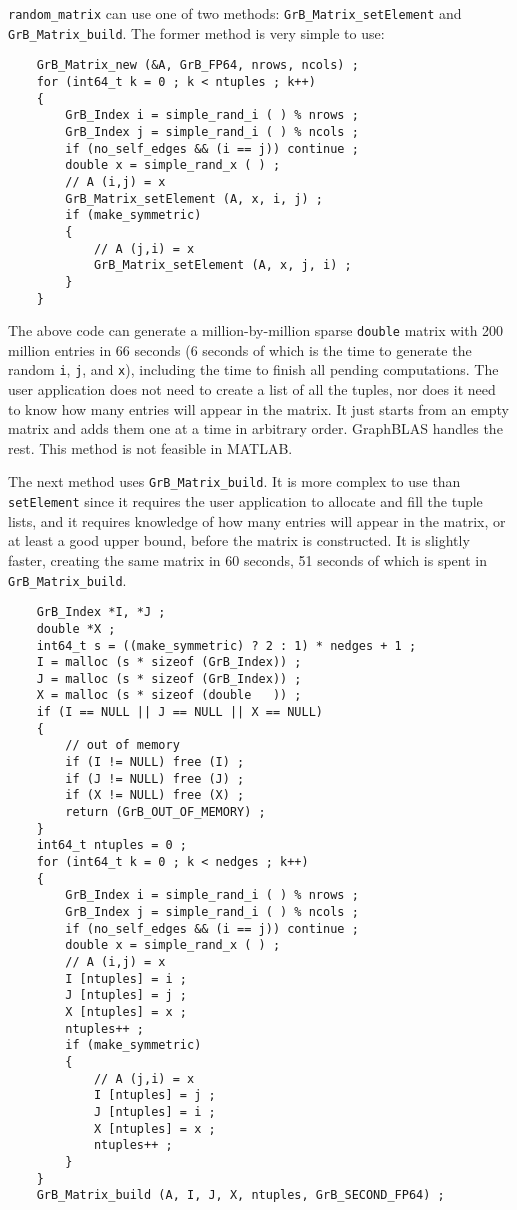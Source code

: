 \documentclass[12pt]{article}
\begin{document}
{\verb'random_matrix' can use one of two methods: \verb'GrB_Matrix_setElement'
and \verb'GrB_Matrix_build'.  The former method is very simple to use:

    {\footnotesize
    \begin{verbatim}
    GrB_Matrix_new (&A, GrB_FP64, nrows, ncols) ;
    for (int64_t k = 0 ; k < ntuples ; k++)
    {
        GrB_Index i = simple_rand_i ( ) % nrows ;
        GrB_Index j = simple_rand_i ( ) % ncols ;
        if (no_self_edges && (i == j)) continue ;
        double x = simple_rand_x ( ) ;
        // A (i,j) = x
        GrB_Matrix_setElement (A, x, i, j) ;
        if (make_symmetric)
        {
            // A (j,i) = x
            GrB_Matrix_setElement (A, x, j, i) ;
        }
    } \end{verbatim}}

The above code can generate a million-by-million sparse \verb'double' matrix
with 200 million entries in 66 seconds (6 seconds of which is the time to
generate the random \verb'i', \verb'j', and \verb'x'), including the time
to finish all pending computations.  The user application does not need to
create a list of all the tuples, nor does it need to know how many entries will
appear in the matrix.  It just starts from an empty matrix and adds them one at
a time in arbitrary order.  GraphBLAS handles the rest.  This method is not
feasible in MATLAB.

The next method uses \verb'GrB_Matrix_build'.  It is more complex to use than
\verb'setElement' since it requires the user application to allocate and fill
the tuple lists, and it requires knowledge of how many entries will appear in
the matrix, or at least a good upper bound, before the matrix is constructed.
It is slightly faster, creating the same matrix in 60 seconds, 51 seconds
of which is spent in \verb'GrB_Matrix_build'.

    {\footnotesize
    \begin{verbatim}
    GrB_Index *I, *J ;
    double *X ;
    int64_t s = ((make_symmetric) ? 2 : 1) * nedges + 1 ;
    I = malloc (s * sizeof (GrB_Index)) ;
    J = malloc (s * sizeof (GrB_Index)) ;
    X = malloc (s * sizeof (double   )) ;
    if (I == NULL || J == NULL || X == NULL)
    {
        // out of memory
        if (I != NULL) free (I) ;
        if (J != NULL) free (J) ;
        if (X != NULL) free (X) ;
        return (GrB_OUT_OF_MEMORY) ;
    }
    int64_t ntuples = 0 ;
    for (int64_t k = 0 ; k < nedges ; k++)
    {
        GrB_Index i = simple_rand_i ( ) % nrows ;
        GrB_Index j = simple_rand_i ( ) % ncols ;
        if (no_self_edges && (i == j)) continue ;
        double x = simple_rand_x ( ) ;
        // A (i,j) = x
        I [ntuples] = i ;
        J [ntuples] = j ;
        X [ntuples] = x ;
        ntuples++ ;
        if (make_symmetric)
        {
            // A (j,i) = x
            I [ntuples] = j ;
            J [ntuples] = i ;
            X [ntuples] = x ;
            ntuples++ ;
        }
    }
    GrB_Matrix_build (A, I, J, X, ntuples, GrB_SECOND_FP64) ; \end{verbatim}}

}
\end{document}

